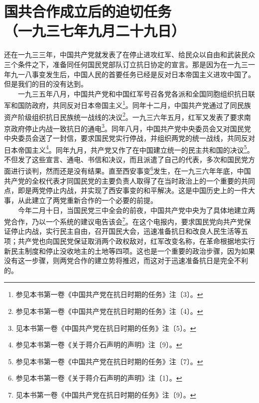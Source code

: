\documentclass[cn,11pt,chinese]{elegantbook}
\def\myformat#1{\hfil\hfil #1}
\begin{document}
\newpage\section*{\myformat{国共合作成立后的迫切任务}\\\myformat{（一九三七年九月二十九日）}}
还在一九三三年，中国共产党就发表了在停止进攻红军、给民众以自由和武装民众三个条件之下，准备同任何国民党部队订立抗日协定的宣言。那是因为在一九三一年九一八事变发生后，中国人民的首要任务已经是反对日本帝国主义进攻中国了。但是我们的目的没有达到。\\
　　一九三五年八月，中国共产党和中国红军号召各党各派和全国同胞组织抗日联军和国防政府，共同反对日本帝国主义\footnote[1]{ 参见本书第一卷《中国共产党在抗日时期的任务》注〔3〕。}。同年十二月，中国共产党通过了同民族资产阶级组织抗日民族统一战线的决议\footnote[2]{ 参见本书第一卷《中国共产党在抗日时期的任务》注〔4〕。}。一九三六年五月，红军又发表了要求南京政府停止内战一致抗日的通电\footnote[3]{ 见本书第一卷《中国共产党在抗日时期的任务》注〔5〕。}。同年八月，中国共产党中央委员会又对国民党中央委员会送了一封信，要求国民党实行停战，并组织两党的统一战线，共同反对日本帝国主义\footnote[4]{ 参见本书第一卷《关于蒋介石声明的声明》注〔9〕。}。同年九月，共产党又作了在中国建立统一的民主共和国的决议\footnote[5]{ 参见本书第一卷《中国共产党在抗日时期的任务》注〔7〕。}。不但发了这些宣言、通电、书信和决议，而且派遣了自己的代表，多次和国民党方面进行谈判，然而还是没有结果。直至西安事变\footnote[6]{ 参见本书第一卷《关于蒋介石声明的声明》注〔1〕。}发生，在一九三六年年底，中国共产党的全权代表才同国民党的主要负责人取得了在当时政治上的一个重要的共同点，即是两党停止内战，并实现了西安事变的和平解决。这是中国历史上的一件大事，从此建立了两党重新合作的一个必要的前提。\\
　　今年二月十日，当国民党三中全会的前夜，中国共产党中央为了具体地建立两党合作，乃以一个系统的建议电告该会\footnote[7]{ 见本书第一卷《中国共产党在抗日时期的任务》注〔9〕。}。在这个电报内，要求国民党向共产党保证停止内战，实行民主自由，召开国民大会，迅速准备抗日和改良人民生活等五项；共产党也向国民党保证取消两个政权敌对，红军改变名称，在革命根据地实行新民主制度和停止没收地主的土地等四项。这也是一个重要的政治步骤，因为如果没有这一步骤，则两党合作的建立势将推迟，而这对于迅速准备抗日是完全不利的。\\
\end{document}
